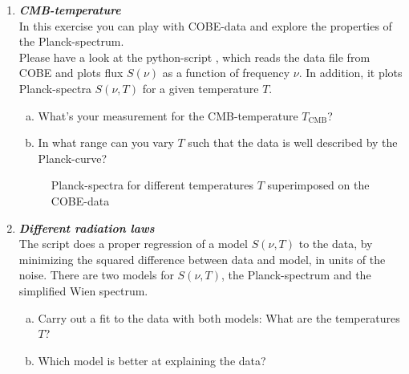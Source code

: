 \documentclass[a4paper,12pt]{article}
\newcommand{\question}[1]{\textbf{\textit{#1}}}
\begin{document}
\begin{enumerate}

\item \question{CMB-temperature}\\
In this exercise you can play with COBE-data and explore the properties of the Planck-spectrum.\\
Please have a look at the python-script , which reads the data file from COBE and plots flux $S(\nu)$ as a function of frequency $\nu$. In addition, it plots Planck-spectra $S(\nu, T)$ for a given temperature $T$. 
\begin{enumerate}[(a)]
\item{What's your measurement for the CMB-temperature $T_\mathrm{CMB}$?}
\item{In what range can you vary $T$ such that the data is well described by the Planck-curve?}
\end{enumerate}

\begin{figure}[h]
\begin{center}
\caption{Planck-spectra for different temperatures $T$ superimposed on the COBE-data}
\end{center}
\end{figure}

\item \question{Different radiation laws}\\
The script  does a proper regression of a model $S(\nu,T)$ to the data, by minimizing the squared difference between data and model, in units of the noise. There are two models for $S(\nu,T)$, the Planck-spectrum and the simplified Wien spectrum.
\begin{enumerate}[(a)]
\item{Carry out a fit to the data with both models: What are the temperatures $T$?}
\item{Which model is better at explaining the data?}
\end{enumerate}


\end{enumerate}
\end{document}
